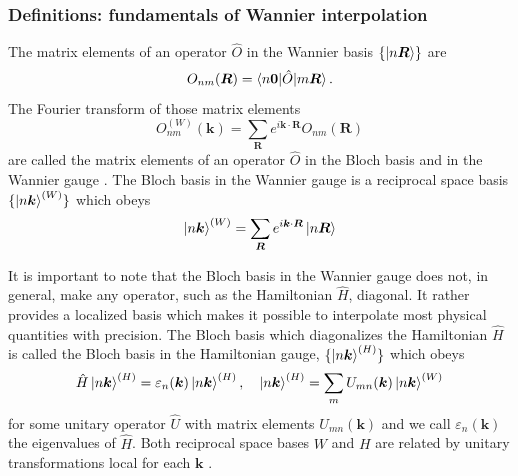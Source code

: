 \documentclass[10pt,a4paper]{article}
\begin{document}
\subsubsection{Definitions: fundamentals of Wannier interpolation}
The matrix elements of an operator $\hat{O}$ in the Wannier basis $\{\ket{n\bm{R}}\}$ are
\begin{equation}
O_{nm}(\bm{R}) = \braket{n\bm{0}|\hat{O}|m\bm{R}}.
\end{equation}
The Fourier transform of those matrix elements
\begin{equation}\label{eq:ft}
O_{nm}^{(W)}(\bm{k}) = \sum_{\bm{R}} e^{i\bm{k}\cdot\bm{R}} O_{nm}(\bm{R})
\end{equation}
are called the matrix elements of an operator $\hat{O}$ in the Bloch basis and in the Wannier gauge \cite{marzariMaximallyLocalizedWannier2012, wangInitioCalculationAnomalous2006, yatesSpectralFermiSurface2007}. The Bloch basis in the Wannier gauge is a reciprocal space basis $\{\ket{n\bm{k}}^{(W)}\}$ which obeys
\begin{equation}
\ket{n\bm{k}}^{(W)} = \sum_{\bm{R}} e^{i\bm{k}\cdot\bm{R}} \ket{n\bm{R}}
\end{equation}

It is important to note that the Bloch basis in the Wannier gauge does not, in general, make any operator, such as the Hamiltonian $\hat{H}$, diagonal. It rather provides a localized basis which makes it possible to interpolate most physical quantities with precision. The Bloch basis which diagonalizes the Hamiltonian $\hat{H}$ is called the Bloch basis in the Hamiltonian gauge, $\{\ket{n\bm{k}}^{(H)}\}$ which obeys
\begin{equation}\label{eq:hamil_gauge}
\hat{H}\ket{n\bm{k}}^{(H)} = \varepsilon_n(\bm{k})\ket{n\bm{k}}^{(H)},\quad \ket{n\bm{k}}^{(H)} = \sum_{m} U_{mn}(\bm{k}) \ket{n\bm{k}}^{(W)}
\end{equation}
for some unitary operator $\hat{U}$ with matrix elements $U_{mn}(\bm{k})$ and we call $\varepsilon_n(\bm{k})$ the eigenvalues of $\hat{H}$. Both reciprocal space bases $W$ and $H$ are related by unitary transformations local for each $\bm{k}$ \cite{wangInitioCalculationAnomalous2006}.
\end{document}
